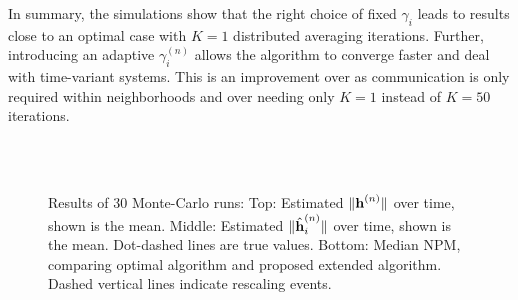 \documentclass{article}
\begin{document}
In summary, the simulations show that the right choice of fixed \(\gamma_i\) leads to results close to an optimal case with \(K=1\) distributed averaging iterations.
Further, introducing an adaptive \(\gamma_i^{(n)}\) allows the algorithm to converge faster and deal with time-variant systems.
This is an improvement over \cite{blochbergerDBSI} as communication is only required within neighborhoods and over \cite{liuDistributedBlindIdentification2016,liuDistributedRecursiveBlind2017} needing only \(K=1\) instead of \(K=50\) iterations.


\begin{figure}[t]
    \centering
    \\\vspace*{-1.0cm}
    \\\vspace*{-1.0cm}
    
    \vspace*{-0.6cm}
    \caption[]{Results of 30 Monte-Carlo runs: Top: Estimated \(\|\bm{\mathrm{h}}^{(n)}\|\) over time, shown is the mean. Middle: Estimated \(\|\hat{\bm{\mathrm{h}}}_i^{(n)}\|\) over time, shown is the mean. Dot-dashed lines are true values. Bottom: Median NPM, comparing optimal algorithm and proposed extended algorithm. Dashed vertical lines indicate rescaling events.}
    \label{fig:simulations:NPMtimedyn}
\end{figure}
\end{document}
